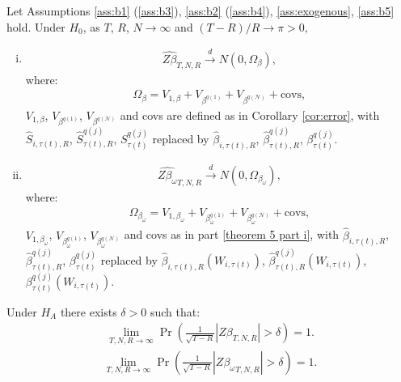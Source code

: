 \begin{theorem}
Let Assumptions \ref{ass:b1} (\ref{ass:b3}), \ref{ass:b2} (\ref{ass:b4}), \ref{ass:exogenous}, \ref{ass:b5} hold. Under $H_0$, as $T$, $R$, $N \rightarrow \infty$ and $(T - R)/R \rightarrow \pi > 0$,
\begin{enumerate}[(i)]
\item \label{theorem 5 part i}
\begin{align}
    \widehat{Z \beta}_{T,N,R} \xrightarrow{d} N (0, \Omega_\beta),
\end{align}
where:
\begin{align}
    \Omega_\beta = V_{1,\beta} + V_{\beta^{q(1)}} + V_{\beta^{q(\mathcal{N})}} + \text{covs},
\end{align}
$V_{1,\beta}$, $V_{\beta^{q(1)}}$, $V_{\beta^{q(\mathcal{N})}}$ and covs are defined as in Corollary \ref{cor:error}, with $\widehat{S}_{i,\tau(t),R}$, $\widehat{S}_{\tau(t),R}^{q(j)}$, $S_{\tau(t)}^{q(j)}$ replaced by $\widehat{\beta}_{i,\tau(t),R}$, $\widehat{\beta}_{\tau(t),R}^{q(j)}$, $\beta_{\tau(t)}^{q(j)}$.
\item 
\begin{align}
    \widehat{Z \beta_\omega}_{T,N,R} \xrightarrow{d} N (0, \Omega_{\beta_\omega}),
\end{align} 
where:
\begin{align}
    \Omega_{\beta_\omega} = V_{1,\beta_\omega} + V_{\beta_\omega^{q(1)}} + V_{\beta_\omega^{q(\mathcal{N})}} + \text{covs},
\end{align}
$V_{1,\beta_\omega}$, $V_{\beta_\omega^{q(1)}}$, $V_{\beta_\omega^{q(\mathcal{N})}}$ and covs as in part \ref{theorem 5 part i}, with $\widehat{\beta}_{i,\tau(t),R}$, $\widehat{\beta}_{\tau(t),R}^{q(j)}$, $\beta_{\tau(t)}^{q(j)}$ replaced by $\widehat{\beta}_{i,\tau(t),R}(W_{i,\tau(t)})$, $\widehat{\beta}_{\tau(t),R}^{q(j)}(W_{i,\tau(t)})$, $\beta_{\tau(t)}^{q(j)}(W_{i,\tau(t)})$.
\end{enumerate}
Under $H_A$ there exists $\delta > 0$ such that:
\begin{align}
\lim_{T,N,R \rightarrow \infty} \Pr\left( \frac{1}{\sqrt{T - R}} \left| \widehat{Z\beta}_{T, N, R} \right| > \delta \right) = 1.
\end{align}
\begin{align}
\lim_{T,N,R \rightarrow \infty} \Pr\left( \frac{1}{\sqrt{T - R}} \left| \widehat{Z\beta_{\omega}}_{T, N, R} \right| > \delta \right) = 1.
\end{align}
\end{theorem}

